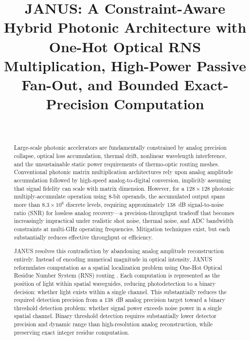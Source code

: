 \documentclass[journal]{IEEEtran}
\title{
JANUS: A Constraint-Aware Hybrid Photonic Architecture with One-Hot Optical RNS Multiplication, High-Power Passive Fan-Out, and Bounded Exact-Precision Computation
}
\author{
\IEEEauthorblockN{Deepanshu Bhardwaj}\\[2pt]
\IEEEauthorblockA{\small Patent Application No.: 202611052791 (Patent Pending)}
}
\begin{document}
\maketitle

\begin{abstract}

Large-scale photonic accelerators are fundamentally constrained by analog precision collapse, optical loss accumulation, thermal drift, nonlinear wavelength interference, and the unsustainable static power requirements of thermo-optic routing meshes. Conventional photonic matrix multiplication architectures rely upon analog amplitude accumulation followed by high-speed analog-to-digital conversion, implicitly assuming that signal fidelity can scale with matrix dimension. However, for a $128 \times 128$ photonic multiply-accumulate operation using 8-bit operands, the accumulated output spans more than $8.3 \times 10^{6}$ discrete levels, requiring approximately $138$~dB signal-to-noise ratio (SNR) for lossless analog recovery---a precision-throughput tradeoff that becomes increasingly impractical under realistic shot noise, thermal noise, and ADC bandwidth constraints at multi-GHz operating frequencies. Mitigation techniques exist, but each substantially reduces effective throughput or efficiency. 

JANUS resolves this contradiction by abandoning analog amplitude reconstruction entirely. Instead of encoding numerical magnitude in optical intensity, JANUS reformulates computation as a spatial localization problem using One-Hot Optical Residue Number System (RNS) routing \cite{Omosanya2021}\cite{Huang1979}\cite{Sorger2018}. Each computation is represented as the position of light within spatial waveguides, reducing photodetection to a binary decision: whether light exists within a single channel. This substantially reduces the required detection precision from a $138$~dB analog precision target toward a binary threshold detection problem: whether signal power exceeds noise power in a single spatial channel. Binary threshold detection requires substantially lower detector precision and dynamic range than high-resolution analog reconstruction, while preserving exact integer residue computation.


\end{abstract}
\end{document}

